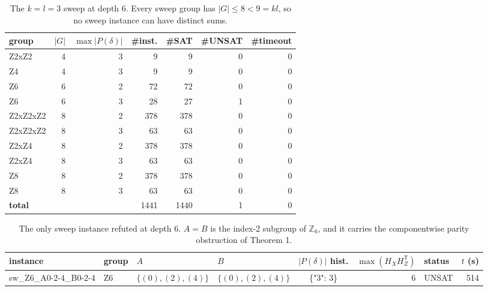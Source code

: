 \begin{table}[tb]
\centering
\small
\caption{The $k=l=3$ sweep at depth 6. Every sweep group has $|G|\leq 8<9=kl$, so no sweep instance can have distinct sums.}
\label{tabS:sweep}
\begin{tabular}{lrrrrrr}
\toprule
group & $|G|$ & $\max|P(\delta)|$ & \#inst. & \#SAT & \#UNSAT & \#timeout \\
\midrule
Z2xZ2 & 4 & 3 & 9 & 9 & 0 & 0 \\
Z4 & 4 & 3 & 9 & 9 & 0 & 0 \\
Z6 & 6 & 2 & 72 & 72 & 0 & 0 \\
Z6 & 6 & 3 & 28 & 27 & 1 & 0 \\
Z2xZ2xZ2 & 8 & 2 & 378 & 378 & 0 & 0 \\
Z2xZ2xZ2 & 8 & 3 & 63 & 63 & 0 & 0 \\
Z2xZ4 & 8 & 2 & 378 & 378 & 0 & 0 \\
Z2xZ4 & 8 & 3 & 63 & 63 & 0 & 0 \\
Z8 & 8 & 2 & 378 & 378 & 0 & 0 \\
Z8 & 8 & 3 & 63 & 63 & 0 & 0 \\
\textbf{total} &  &  & 1441 & 1440 & 1 & 0 \\
\bottomrule
\end{tabular}
\end{table}

\begin{table}[tb]
\centering
\small
\caption{The only sweep instance refuted at depth 6. $A=B$ is the index-2 subgroup of $\mathbb{Z}_6$, and it carries the componentwise parity obstruction of Theorem 1.}
\label{tabS:sweep-unsat}
\begin{tabular}{llllcrlr}
\toprule
instance & group & $A$ & $B$ & $|P(\delta)|$ hist. & $\max(H_XH_Z^{\mathsf T})$ & status & $t$ (s) \\
\midrule
sw\_Z6\_A0-2-4\_B0-2-4 & Z6 & $\{(0),(2),(4)\}$ & $\{(0),(2),(4)\}$ & \{"3": 3\} & 6 & UNSAT & 514 \\
\bottomrule
\end{tabular}
\end{table}
